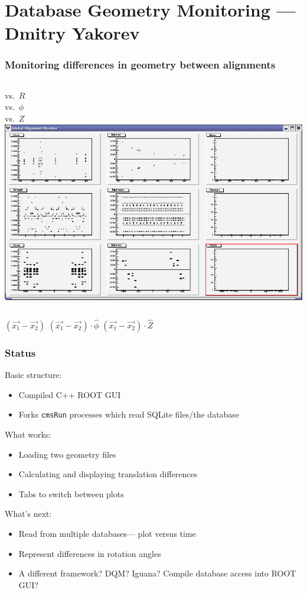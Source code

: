 \documentclass[compress]{beamer}
\begin{document}
\section*{Database Geometry Monitoring --- Dmitry Yakorev}

\begin{frame}
\frametitle{Monitoring differences in geometry between alignments}
\begin{columns}
vs.\ $R$ \\

\vspace{1 cm}
vs.\ $\phi$ \\

\vspace{1 cm}
vs.\ $Z$ \\
\includegraphics[width=\linewidth]{screen_shot.png}
\end{columns}

\vfill
\hfill $(\vec{x_1}-\vec{x_2})$ \hfill $(\vec{x_1}-\vec{x_2})\cdot\hat{\phi}$ \hfill $(\vec{x_1}-\vec{x_2})\cdot\hat{Z}$ \hfill
\end{frame}

\begin{frame}
\frametitle{Status}

Basic structure:
\begin{itemize}
  \item Compiled C++ ROOT GUI
  \item Forks {\tt cmsRun} processes which read SQLite files/the database
\end{itemize}

What works:
\begin{itemize}
  \item Loading two geometry files
  \item Calculating and displaying translation differences
  \item Tabs to switch between plots
\end{itemize}

\vfill
What's next:
\begin{itemize}
  \item Read from multiple databases--- plot versus time
  \item Represent differences in rotation angles
  \item A different framework?  DQM?  Iguana?  Compile database access into ROOT GUI?
\end{itemize}
\end{frame}
\end{document}
